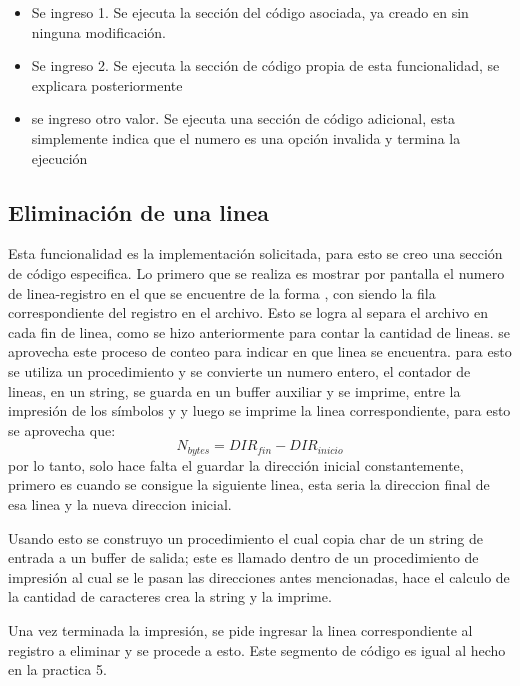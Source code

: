 \begin{itemize}
        \item Se ingreso 1. Se ejecuta la sección del código asociada, ya creado
            en \cite{pract5} sin ninguna modificación.

        \item Se ingreso 2. Se ejecuta la sección de código propia de esta
            funcionalidad, se explicara posteriormente

        \item se ingreso otro valor. Se ejecuta una sección de código adicional,
            esta simplemente indica que el numero es una opción invalida y
            termina la ejecución
\end{itemize}

\subsection*{Eliminación de una linea}
Esta funcionalidad es la implementación solicitada, para esto se creo una sección
de código especifica. Lo primero que se realiza es mostrar por pantalla el numero
de linea-registro en el que se encuentre de la forma , con 
siendo la fila correspondiente del registro en el archivo.
Esto se logra al separa el archivo en cada fin de linea, como se hizo anteriormente
para contar la cantidad de lineas. se aprovecha este proceso de conteo para indicar
en que linea se encuentra. para esto se utiliza un procedimiento  y se convierte
un numero entero, el contador de lineas, en un string, se guarda en un buffer
auxiliar y se imprime, entre la impresión de los símbolos \comillas{(} y
\comillas{)} y luego se imprime la linea correspondiente, para esto se aprovecha
que:
$$ N_{bytes} = DIR_{fin} - DIR_{inicio}$$
por lo tanto, solo hace falta el guardar la dirección inicial constantemente,
primero es  cuando se consigue la siguiente linea, esta seria la
direccion final de esa linea y la nueva direccion inicial.

Usando esto se construyo
un procedimiento el cual copia  char de un string de entrada a un buffer
de salida; este es llamado dentro de un procedimiento de impresión al cual se le
pasan las direcciones antes mencionadas, hace el calculo de la cantidad de caracteres
crea la string y la imprime.


Una vez terminada la impresión, se pide ingresar la linea correspondiente al
registro a eliminar y se procede a esto. Este segmento de código es igual al hecho
en la practica 5.

